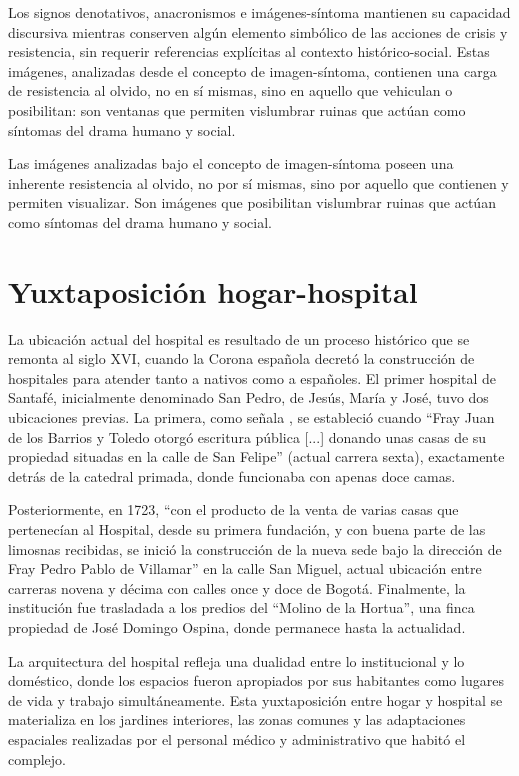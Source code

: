 Los signos denotativos, anacronismos e imágenes-síntoma mantienen su capacidad discursiva mientras conserven algún elemento simbólico de las acciones de crisis y resistencia, sin requerir referencias explícitas al contexto histórico-social. Estas imágenes, analizadas desde el concepto de imagen-síntoma, contienen una carga de resistencia al olvido, no en sí mismas, sino en aquello que vehiculan o posibilitan: son ventanas que permiten vislumbrar ruinas que actúan como síntomas del drama humano y social.


Las imágenes analizadas bajo el concepto de imagen-síntoma poseen una inherente resistencia al olvido, no por sí mismas, sino por aquello que contienen y permiten visualizar. Son imágenes que posibilitan vislumbrar ruinas que actúan como síntomas del drama humano y social.

\section{Yuxtaposición hogar-hospital}

La ubicación actual del hospital es resultado de un proceso histórico que se remonta al siglo XVI, cuando la Corona española decretó la construcción de hospitales para atender tanto a nativos como a españoles. El primer hospital de Santafé, inicialmente denominado San Pedro, de Jesús, María y José, tuvo dos ubicaciones previas. La primera, como señala \textcite{Romero1994}, se estableció cuando \enquote{Fray Juan de los Barrios y Toledo otorgó escritura pública [...] donando unas casas de su propiedad situadas en la calle de San Felipe} (actual carrera sexta), exactamente detrás de la catedral primada, donde funcionaba con apenas doce camas. 

Posteriormente, en 1723, \enquote{con el producto de la venta de varias casas que pertenecían al Hospital, desde su primera fundación, y con buena parte de las limosnas recibidas, se inició la construcción de la nueva sede bajo la dirección de Fray Pedro Pablo de Villamar} en la calle San Miguel, actual ubicación entre carreras novena y décima con calles once y doce de Bogotá. Finalmente, la institución fue trasladada a los predios del \enquote{Molino de la Hortua}, una finca propiedad de José Domingo Ospina, donde permanece hasta la actualidad.

La arquitectura del hospital refleja una dualidad entre lo institucional y lo doméstico, donde los espacios fueron apropiados por sus habitantes como lugares de vida y trabajo simultáneamente. Esta yuxtaposición entre hogar y hospital se materializa en los jardines interiores, las zonas comunes y las adaptaciones espaciales realizadas por el personal médico y administrativo que habitó el complejo.

